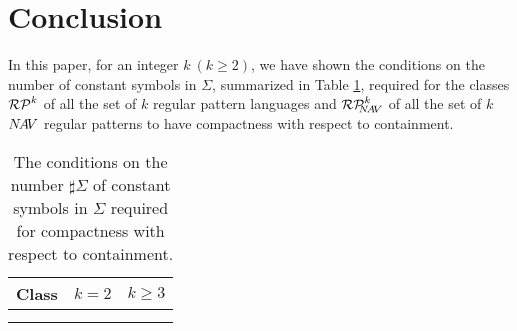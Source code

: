 \section{Conclusion}
In this paper, for an integer $k~(k\ge 2)$, we have shown the conditions on the number of constant symbols in $\Sigma$, summarized in Table \ref{table:results}, required for the classes $\RPatkei$ of all the set of $k$ regular pattern languages and $\NAVRPkei$ of all the set of $k$ $N\!A\!V$ regular patterns to have compactness with respect to containment.
\begin{table}
\caption{The conditions on the number $\sharp \Sigma$ of constant symbols in $\Sigma$ required for compactness with respect to containment.}\label{table:results}
\begin{center}
\begin{tabular}{c|c|c}
  Class & $k=2$ & $k\ge 3$\\
  \hline
  \raisebox{-5pt}{$\RPatkei$} & \raisebox{-5pt}{$\sharp \Sigma \ge 4$} & \raisebox{-5pt}{$\sharp \Sigma \ge 2k-1$} \\[10pt]
  \hline
  \raisebox{-5pt}{$\NAVRPkei$} & \multicolumn{2}{c}{\raisebox{-5pt}{$\sharp \Sigma \ge k+2$}}\\[10pt]
\end{tabular}
\end{center}
\vspace*{-10pt}
\end{table}


